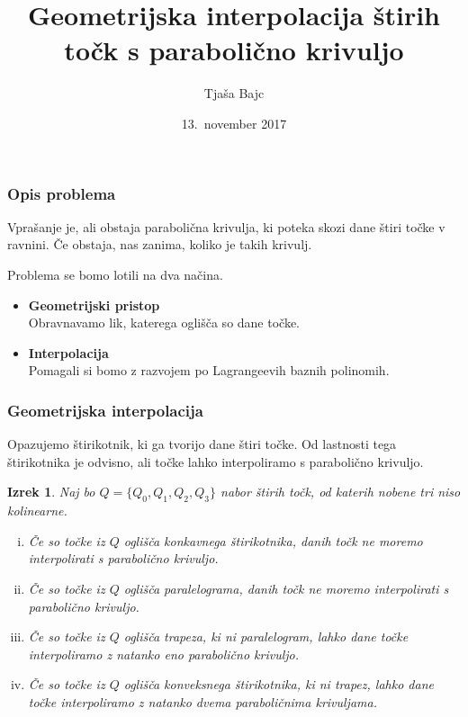 \documentclass{beamer}
\title{Geometrijska interpolacija štirih točk s parabolično krivuljo}
\author{Tjaša Bajc}
\institute{mentorica \\ izr.~prof.~dr.~Marjetka Knez}
\date{13.\ november 2017}
\newtheorem{izrek}{Izrek}
\begin{document}

\begin{frame}
\titlepage
\end{frame}


\begin{frame}
\frametitle{Opis problema}

Vprašanje je, ali obstaja parabolična krivulja, ki poteka skozi dane štiri točke v ravnini. Če obstaja, nas zanima, koliko je takih krivulj.

Problema se bomo lotili na dva načina.

\begin{itemize}

\item \textbf{Geometrijski pristop} \\
Obravnavamo lik, katerega oglišča so dane točke.

\item \textbf{Interpolacija} \\
 Pomagali si bomo z razvojem po Lagrangeevih baznih polinomih.

\end{itemize}

\end{frame}



\begin{frame}
\frametitle{Geometrijska interpolacija}

Opazujemo štirikotnik, ki ga tvorijo dane štiri točke. Od lastnosti tega štirikotnika je odvisno, ali točke lahko interpoliramo s parabolično krivuljo.

\begin{izrek}
Naj bo $Q = \{ Q_0, Q_1, Q_2, Q_3 \}$ nabor štirih točk, od katerih nobene tri niso kolinearne.

\begin{enumerate}[i)]
\pause
\item Če so točke iz $Q$ oglišča konkavnega štirikotnika, danih točk ne moremo interpolirati s parabolično krivuljo.
\pause
\item Če so točke iz $Q$ oglišča paralelograma, danih točk ne moremo interpolirati s parabolično krivuljo.
\pause
\item Če so točke iz $Q$ oglišča trapeza, ki ni paralelogram, lahko dane točke interpoliramo z natanko eno parabolično krivuljo.
\pause
\item Če so točke iz $Q$ oglišča konveksnega štirikotnika, ki ni trapez, lahko dane točke interpoliramo z natanko dvema paraboličnima krivuljama.
\end{enumerate}

\end{izrek}

\end{frame}
\end{document}
